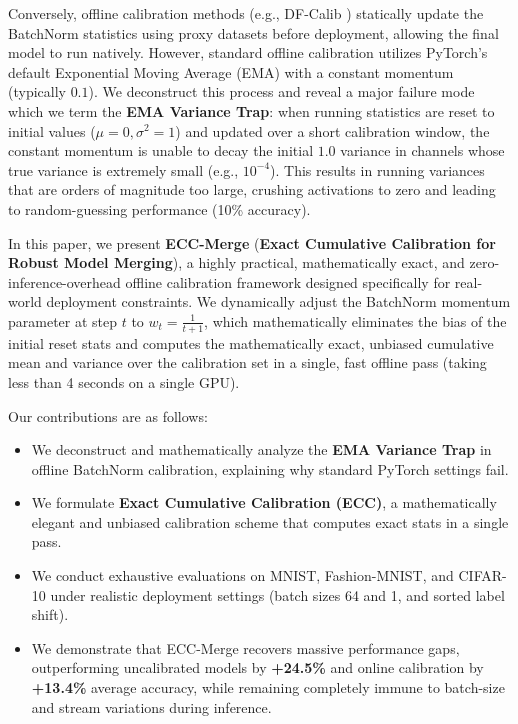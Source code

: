 \documentclass{article}
\theoremstyle{plain}
\theoremstyle{definition}
\theoremstyle{remark}
\begin{document}
Conversely, offline calibration methods (e.g., DF-Calib \cite{dfcalib}) statically update the BatchNorm statistics using proxy datasets before deployment, allowing the final model to run natively. However, standard offline calibration utilizes PyTorch's default Exponential Moving Average (EMA) with a constant momentum (typically $0.1$). We deconstruct this process and reveal a major failure mode which we term the \textbf{EMA Variance Trap}: when running statistics are reset to initial values ($\mu=0, \sigma^2=1$) and updated over a short calibration window, the constant momentum is unable to decay the initial $1.0$ variance in channels whose true variance is extremely small (e.g., $10^{-4}$). This results in running variances that are orders of magnitude too large, crushing activations to zero and leading to random-guessing performance (10\% accuracy).

In this paper, we present \textbf{ECC-Merge} (\textbf{Exact Cumulative Calibration for Robust Model Merging}), a highly practical, mathematically exact, and zero-inference-overhead offline calibration framework designed specifically for real-world deployment constraints. We dynamically adjust the BatchNorm momentum parameter at step $t$ to $w_t = \frac{1}{t+1}$, which mathematically eliminates the bias of the initial reset stats and computes the mathematically exact, unbiased cumulative mean and variance over the calibration set in a single, fast offline pass (taking less than 4 seconds on a single GPU).

Our contributions are as follows:
\begin{itemize}
    \item We deconstruct and mathematically analyze the \textbf{EMA Variance Trap} in offline BatchNorm calibration, explaining why standard PyTorch settings fail.
    \item We formulate \textbf{Exact Cumulative Calibration (ECC)}, a mathematically elegant and unbiased calibration scheme that computes exact stats in a single pass.
    \item We conduct exhaustive evaluations on MNIST, Fashion-MNIST, and CIFAR-10 under realistic deployment settings (batch sizes 64 and 1, and sorted label shift).
    \item We demonstrate that ECC-Merge recovers massive performance gaps, outperforming uncalibrated models by \textbf{+24.5\%} and online calibration by \textbf{+13.4\%} average accuracy, while remaining completely immune to batch-size and stream variations during inference.
\end{itemize}
\end{document}
